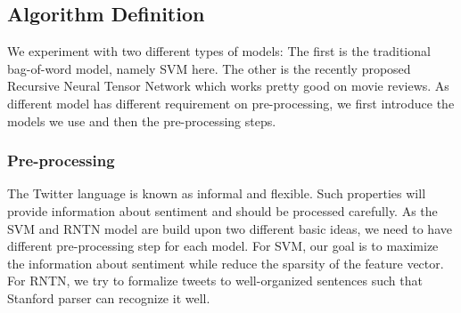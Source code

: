 \subsection{Algorithm Definition}
We experiment with two different types of models: The first is the traditional bag-of-word model, namely SVM here. The other is the recently proposed Recursive Neural Tensor Network which works pretty good on movie reviews. As different model has different requirement on pre-processing, we first introduce the models we use and then the pre-processing steps. 

\subsubsection{Pre-processing}
The Twitter language is known as informal and flexible. Such properties will provide information about sentiment and should be processed carefully. As the SVM and RNTN model are build upon two different basic ideas, we need to have different pre-processing step for each model. For SVM, our goal is to maximize the information about sentiment while reduce the sparsity of the feature vector. For RNTN, we try to formalize tweets to well-organized sentences such that Stanford parser can recognize it well.

